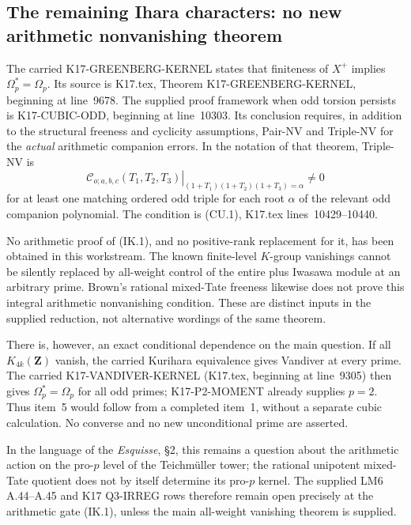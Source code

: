 \subsection{The remaining Ihara characters: no new arithmetic
nonvanishing theorem}
\label{sec:kt-ihara-gate}

The carried K17-GREENBERG-KERNEL states that finiteness of
$X^+$ implies $\Omega_p^*=\Omega_p$. Its source is
K17.tex, Theorem K17-GREENBERG-KERNEL, beginning at
line~9678. The supplied proof framework when odd torsion
persists is K17-CUBIC-ODD, beginning at line~10303.
Its conclusion requires, in addition to the structural
freeness and cyclicity assumptions, Pair-NV and Triple-NV
for the \emph{actual} arithmetic companion errors.
In the notation of that theorem, Triple-NV is
\[
 \left.
 \mathcal C_{o;a,b,c}(T_1,T_2,T_3)
 \right|_{(1+T_1)(1+T_2)(1+T_3)=\alpha}\ne0
                                                               \tag{IK.1}
\]
for at least one matching ordered odd triple for each root
$\alpha$ of the relevant odd companion polynomial.
The condition is (CU.1), K17.tex lines~10429--10440.

No arithmetic proof of (IK.1), and no positive-rank
replacement for it, has been obtained in this workstream.
The known finite-level $K$-group vanishings cannot be
silently replaced by all-weight control of the entire
plus Iwasawa module at an arbitrary prime. Brown's rational
mixed-Tate freeness likewise does not prove this integral
arithmetic nonvanishing condition. These are distinct
inputs in the supplied reduction, not alternative wordings
of the same theorem.

There is, however, an exact conditional dependence on the
main question. If all $K_{4k}(\mathbf Z)$ vanish, the carried
Kurihara equivalence gives Vandiver at every prime. The
carried K17-VANDIVER-KERNEL (K17.tex, beginning at line~9305)
then gives $\Omega_p^*=\Omega_p$ for all odd primes; K17-P2-MOMENT
already supplies $p=2$. Thus item~5 would follow from a
completed item~1, without a separate cubic calculation.
No converse and no new unconditional prime are asserted.

In the language of the \emph{Esquisse}, \S2, this remains
a question about the arithmetic action on the pro-$p$
level of the Teichm\"uller tower; the rational unipotent
mixed-Tate quotient does not by itself determine its
pro-$p$ kernel. The supplied LM6 A.44--A.45 and K17
Q3-IRREG rows therefore remain open precisely at the
arithmetic gate (IK.1), unless the main all-weight
vanishing theorem is supplied.


